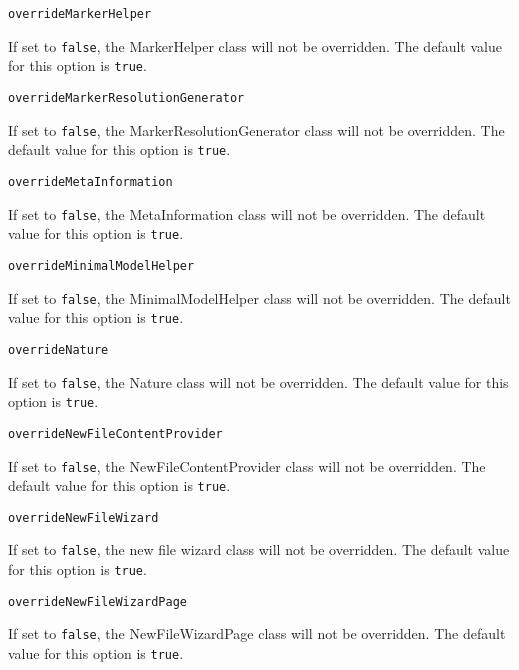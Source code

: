 \noindent\texttt{overrideMarkerHelper}
\begin{myindentpar}{1cm}
If set to \texttt{false}, the MarkerHelper class will not be overridden. The default value for this option is \texttt{true}.
\end{myindentpar}

\noindent\texttt{overrideMarkerResolutionGenerator}
\begin{myindentpar}{1cm}
If set to \texttt{false}, the MarkerResolutionGenerator class will not be overridden. The default value for this option is \texttt{true}.
\end{myindentpar}

\noindent\texttt{overrideMetaInformation}
\begin{myindentpar}{1cm}
If set to \texttt{false}, the MetaInformation class will not be overridden. The default value for this option is \texttt{true}.
\end{myindentpar}

\noindent\texttt{overrideMinimalModelHelper}
\begin{myindentpar}{1cm}
If set to \texttt{false}, the MinimalModelHelper class will not be overridden. The default value for this option is \texttt{true}.
\end{myindentpar}

\noindent\texttt{overrideNature}
\begin{myindentpar}{1cm}
If set to \texttt{false}, the Nature class will not be overridden. The default value for this option is \texttt{true}.
\end{myindentpar}

\noindent\texttt{overrideNewFileContentProvider}
\begin{myindentpar}{1cm}
If set to \texttt{false}, the NewFileContentProvider class will not be overridden. The default value for this option is \texttt{true}.
\end{myindentpar}

\noindent\texttt{overrideNewFileWizard}
\begin{myindentpar}{1cm}
If set to \texttt{false}, the new file wizard class will not be overridden. The default value for this option is \texttt{true}.
\end{myindentpar}

\noindent\texttt{overrideNewFileWizardPage}
\begin{myindentpar}{1cm}
If set to \texttt{false}, the NewFileWizardPage class will not be overridden. The default value for this option is \texttt{true}.
\end{myindentpar}

